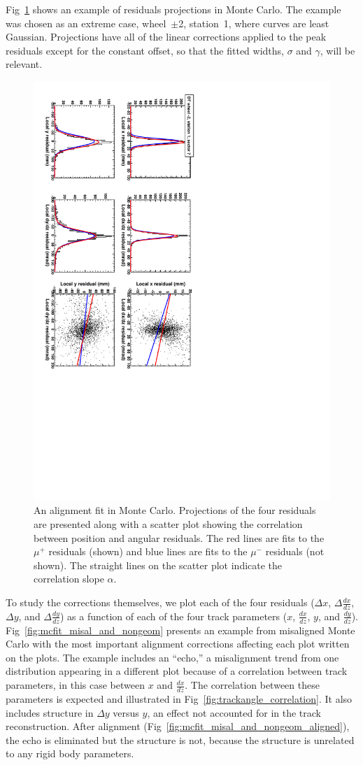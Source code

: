 \documentclass[12pt]{article}
\begin{document}
Fig~\ref{fig:mcfit_extreme_corner2} shows an example of residuals
projections in Monte Carlo.  The example was chosen as an extreme
case, wheel~$\pm$2, station~1, where curves are least Gaussian.
Projections have all of the linear corrections applied to the peak
residuals except for the constant offset, so that the fitted widths,
$\sigma$ and $\gamma$, will be relevant.

\begin{figure}
\includegraphics[height=\linewidth, angle=90]{mcfit_extreme_corner2.pdf}
\caption{An alignment fit in Monte Carlo.  Projections of the four
  residuals are presented along with a scatter plot showing the
  correlation between position and angular residuals.  The red lines
  are fits to the $\mu^+$ residuals (shown) and blue lines are fits to
  the $\mu^-$ residuals (not shown).  The straight lines on the
  scatter plot indicate the correlation slope
  $\alpha$.  \label{fig:mcfit_extreme_corner2}}
\end{figure}

To study the corrections themselves, we plot each of the four
residuals ($\Delta x$, $\Delta \frac{dx}{dz}$, $\Delta y$, and $\Delta
\frac{dy}{dz}$) as a function of each of the four track parameters
($x$, $\frac{dx}{dz}$, $y$, and $\frac{dy}{dz}$).
Fig~\ref{fig:mcfit_misal_and_nongeom} presents an example from
misaligned Monte Carlo with the most important alignment corrections
affecting each plot written on the plots.  The example includes an
``echo,'' a misalignment trend from one distribution appearing in a
different plot because of a correlation between track parameters, in
this case between $x$ and $\frac{dx}{dz}$.  The correlation between
these parameters is expected and illustrated in
Fig~\ref{fig:trackangle_correlation}.  It also includes structure in
$\Delta y$ versus $y$, an effect not accounted for in the track
reconstruction.  After alignment
(Fig~\ref{fig:mcfit_misal_and_nongeom_aligned}), the echo is
eliminated but the structure is not, because the structure is
unrelated to any rigid body parameters.
\end{document}
